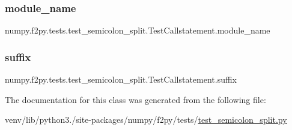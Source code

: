 \subsubsection{\texorpdfstring{module\+\_\+name}{module\_name}}
{\footnotesize\ttfamily numpy.\+f2py.\+tests.\+test\+\_\+semicolon\+\_\+split.\+Test\+Callstatement.\+module\+\_\+name\hspace{0.3cm}{\ttfamily [static]}}

\mbox{\label{classnumpy_1_1f2py_1_1tests_1_1test__semicolon__split_1_1TestCallstatement_a8b9a53b37f1469e277b7087e872cbe3e}} 
\subsubsection{\texorpdfstring{suffix}{suffix}}
{\footnotesize\ttfamily numpy.\+f2py.\+tests.\+test\+\_\+semicolon\+\_\+split.\+Test\+Callstatement.\+suffix\hspace{0.3cm}{\ttfamily [static]}}



The documentation for this class was generated from the following file\+:\begin{DoxyCompactItemize}
\item 
venv/lib/python3./site-\/packages/numpy/f2py/tests/\hyperlink{test__semicolon__split_8py}{test\+\_\+semicolon\+\_\+split.\+py}\end{DoxyCompactItemize}
